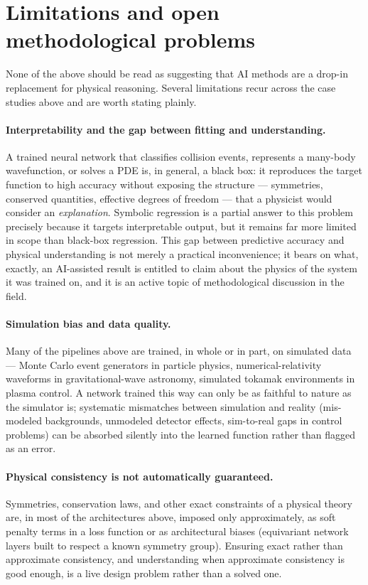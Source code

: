 \documentclass[11pt]{article}
\begin{document}
\section{Limitations and open methodological problems}
\label{sec:limits}

None of the above should be read as suggesting that AI methods are a drop-in replacement for physical reasoning. Several limitations recur across the case studies above and are worth stating plainly.

\paragraph{Interpretability and the gap between fitting and understanding.} A trained neural network that classifies collision events, represents a many-body wavefunction, or solves a PDE is, in general, a black box: it reproduces the target function to high accuracy without exposing the structure --- symmetries, conserved quantities, effective degrees of freedom --- that a physicist would consider an \emph{explanation}. Symbolic regression is a partial answer to this problem precisely because it targets interpretable output, but it remains far more limited in scope than black-box regression. This gap between predictive accuracy and physical understanding is not merely a practical inconvenience; it bears on what, exactly, an AI-assisted result is entitled to claim about the physics of the system it was trained on, and it is an active topic of methodological discussion in the field.

\paragraph{Simulation bias and data quality.} Many of the pipelines above are trained, in whole or in part, on simulated data --- Monte Carlo event generators in particle physics, numerical-relativity waveforms in gravitational-wave astronomy, simulated tokamak environments in plasma control. A network trained this way can only be as faithful to nature as the simulator is; systematic mismatches between simulation and reality (mis-modeled backgrounds, unmodeled detector effects, sim-to-real gaps in control problems) can be absorbed silently into the learned function rather than flagged as an error.

\paragraph{Physical consistency is not automatically guaranteed.} Symmetries, conservation laws, and other exact constraints of a physical theory are, in most of the architectures above, imposed only approximately, as soft penalty terms in a loss function or as architectural biases (equivariant network layers built to respect a known symmetry group). Ensuring exact rather than approximate consistency, and understanding when approximate consistency is good enough, is a live design problem rather than a solved one.
\end{document}
